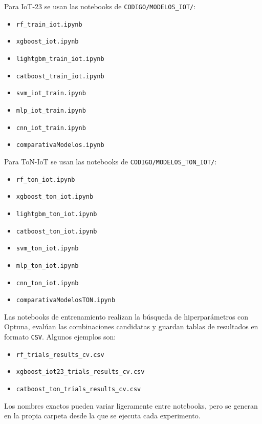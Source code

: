 Para IoT-23 se usan las notebooks de \texttt{CODIGO/MODELOS\_IOT/}:

\begin{itemize}
    \item \texttt{rf\_train\_iot.ipynb}
    \item \texttt{xgboost\_iot.ipynb}
    \item \texttt{lightgbm\_train\_iot.ipynb}
    \item \texttt{catboost\_train\_iot.ipynb}
    \item \texttt{svm\_iot\_train.ipynb}
    \item \texttt{mlp\_iot\_train.ipynb}
    \item \texttt{cnn\_iot\_train.ipynb}
    \item \texttt{comparativaModelos.ipynb}
\end{itemize}

Para ToN-IoT se usan las notebooks de \texttt{CODIGO/MODELOS\_TON\_IOT/}:

\begin{itemize}
    \item \texttt{rf\_ton\_iot.ipynb}
    \item \texttt{xgboost\_ton\_iot.ipynb}
    \item \texttt{lightgbm\_ton\_iot.ipynb}
    \item \texttt{catboost\_ton\_iot.ipynb}
    \item \texttt{svm\_ton\_iot.ipynb}
    \item \texttt{mlp\_ton\_iot.ipynb}
    \item \texttt{cnn\_ton\_iot.ipynb}
    \item \texttt{comparativaModelosTON.ipynb}
\end{itemize}

Las notebooks de entrenamiento realizan la búsqueda de hiperparámetros con Optuna, evalúan las combinaciones candidatas y guardan tablas de resultados en formato \texttt{CSV}. Algunos ejemplos son:

\begin{itemize}
    \item \texttt{rf\_trials\_results\_cv.csv}
    \item \texttt{xgboost\_iot23\_trials\_results\_cv.csv}
    \item \texttt{catboost\_ton\_trials\_results\_cv.csv}
\end{itemize}

Los nombres exactos pueden variar ligeramente entre notebooks, pero se generan en la propia carpeta desde la que se ejecuta cada experimento.

